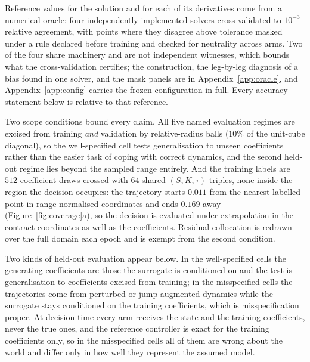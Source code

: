 \documentclass{article}
\begin{document}
Reference values for the solution and for each of its derivatives come from a
numerical oracle: four independently implemented solvers cross-validated to
$10^{-3}$ relative agreement, with points where they disagree above tolerance masked
under a rule declared before training and checked for neutrality across arms. Two of
the four share machinery and are not independent witnesses, which bounds what the
cross-validation certifies; the construction, the leg-by-leg diagnosis of a bias
found in one solver, and the mask panels are in Appendix~\ref{app:oracle}, and
Appendix~\ref{app:config} carries the frozen configuration in full. Every accuracy
statement below is relative to that reference.

Two scope conditions bound every claim. All five named evaluation regimes are
excised from training \emph{and} validation by relative-radius balls ($10\%$ of the unit-cube diagonal), so the
well-specified cell tests generalisation to unseen coefficients rather than the
easier task of coping with correct dynamics, and the second held-out regime lies
beyond the sampled range entirely. And the training labels are $512$ coefficient
draws crossed with $64$ shared $(S,K,\tau)$ triples, none inside the region the
decision occupies: the trajectory starts $0.011$ from the nearest labelled point in
range-normalised coordinates and ends $0.169$ away
(Figure~\ref{fig:coverage}a), so the decision is evaluated under extrapolation in
the contract coordinates as well as the coefficients. Residual collocation is
redrawn over the full domain each epoch and is exempt from the second condition.

Two kinds of held-out evaluation appear below. In the well-specified cells the
generating coefficients are those the surrogate is conditioned on and the test is
generalisation to coefficients excised from training; in the misspecified cells the
trajectories come from perturbed or jump-augmented dynamics while the surrogate
stays conditioned on the training coefficients, which is misspecification proper. At
decision time every arm receives the state and the training coefficients, never the
true ones, and the reference controller is exact for the training coefficients only,
so in the misspecified cells all of them are wrong about the world and differ only
in how well they represent the assumed model.
\end{document}
